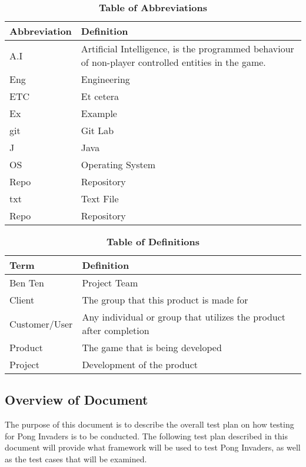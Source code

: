 \documentclass[12pt, titlepage]{article}
\begin{document}
\begin{table}[hbp]
\caption{\textbf{Table of Abbreviations}} \label{Table}

\begin{tabularx}{\textwidth}{p{3cm}X}
\toprule
\textbf{Abbreviation} & \textbf{Definition} \\
\midrule
A.I & Artificial Intelligence, is the programmed behaviour of non-player
controlled entities in the game.\\
Eng & Engineering\\
ETC & Et cetera\\
Ex & Example\\
git & Git Lab\\
J  & Java \\
OS & Operating System\\
Repo & Repository\\
txt & Text File\\
Repo & Repository\\
\bottomrule
\end{tabularx}

\end{table}

\begin{table}[!htbp]
\caption{\textbf{Table of Definitions}} \label{Table}

\begin{tabularx}{\textwidth}{p{3cm}X}
\toprule
\textbf{Term} & \textbf{Definition}\\
\midrule
Ben Ten & Project Team\\
Client & The group that this product is made for\\
Customer/User & Any individual or group that utilizes the product after completion\\
Product & The game that is being developed\\
Project & Development of the product\\
\bottomrule
\end{tabularx}

\end{table}	

\subsection{Overview of Document}
The purpose of this document is to describe the overall test plan on
how testing for Pong Invaders is to be conducted. The following test plan
described in this document will provide what framework will be used to test
Pong Invaders, as well as the test cases that will be examined.
\end{document}
